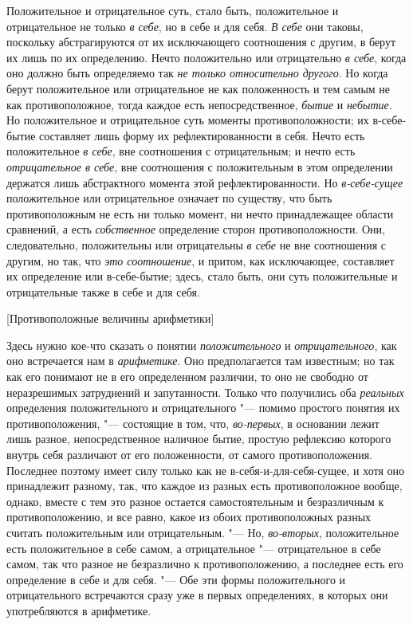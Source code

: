 Положительное и отрицательное суть, стало быть, положительное и
отрицательное не только {\em в себе}, но в себе и для
себя. {\em В себе} они таковы, поскольку абстрагируются
от их исключающего соотношения с другим, в берут их лишь по их определению.
Нечто положительно или отрицательно {\em в себе}, когда
оно должно быть определяемо так {\em не только
относительно другого}. Но когда берут положительное или отрицательное не
как положенность и тем самым не как противоположное, тогда каждое есть
непосредственное, {\em бытие} и
{\em небытие}. Но положительное и отрицательное суть
моменты противоположности; их в-себе-бытие составляет лишь форму их
рефлектированности в себя. Нечто есть положительное
{\em в себе}, вне соотношения с отрицательным; и нечто
есть {\em отрицательное в себе}, вне соотношения с
положительным
в этом определении держатся лишь абстрактного момента этой
рефлектированности. Но {\em в-себе-сущее} положительное
или отрицательное означает по существу, что быть противоположным не есть ни
только момент, ни нечто принадлежащее области сравнений, а есть
{\em собственное} определение сторон противоположности.
Они, следовательно, положительны или отрицательны
{\em в себе} не вне соотношения с другим, но так, что
{\em это соотношение}, и притом, как исключающее,
составляет их определение или в-себе-бытие; здесь, стало быть, они суть
положительные и отрицательные также в себе и для себя.

%
  {[Противоположные величины арифметики]}

Здесь нужно кое-что сказать о понятии {\em положительного} и
{\em отрицательного}, как оно встречается нам в
{\em арифметике}. Оно предполагается там известным; но
так как его понимают не в его определенном различии, то оно не свободно от
неразрешимых затруднений и запутанности. Только что получились оба
{\em реальных} определения положительного и
отрицательного "--- помимо простого понятия их противоположения,
"--- состоящие в том, что, {\em во-первых}, в основании лежит лишь
разное, непосредственное наличное бытие, простую рефлексию которого внутрь
себя различают от его положенности, от самого противоположения. Последнее
поэтому имеет силу только как не в-себя-и-для-себя-сущее, и хотя оно
принадлежит разному, так, что каждое из разных есть противоположное вообще,
однако, вместе с тем это разное остается самостоятельным и безразличным к
противоположению, и все равно, какое из обоих противоположных разных
считать положительным или отрицательным. "--- Но,
{\em во-вторых}, положительное есть положительное в
себе самом, а отрицательное "--- отрицательное в себе самом, так что разное не
безразлично к противоположению, а последнее есть его определение в себе и
для себя. "--- Обе эти формы положительного и отрицательного встречаются сразу
уже в первых определениях, в которых они употребляются в арифметике.

